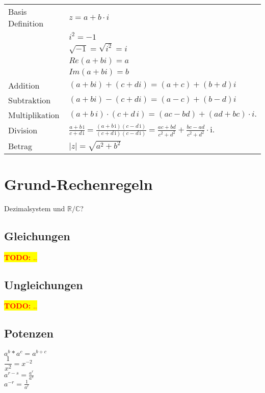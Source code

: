 \documentclass[10pt,a4paper]{article}
\newcommand{\todo}[1]{\begin{flushleft} \colorbox{yellow}{\textcolor{red}{\textbf{TODO:} {#1}}}\end{flushleft} }
\begin{document}
\renewcommand{\arraystretch}{1.5}
\begin{tabular}{ll}
Basis Definition & $ z = a + b \cdot i $ \\ 
				 & $ i^{2} = -1 $ \\ %
				 & $\sqrt{-1} = \sqrt{i^2} = i $ \\
				 & $Re(a + bi) = a$ \\
				 & $Im(a + bi) = b$ \\
Addition 		 & $ (a + bi) + (c + di) = (a+c)+(b+d)i $\\
Subtraktion 	 & $ (a + bi) - (c + di) = (a-c)+(b-d)i $\\
Multiplikation   &  $(a+b\,i)\cdot(c+d\,i)=(ac-bd) + (ad+bc)\cdot i. $\\
Division         & 
    $\frac{a+b\,\mathrm i}{c+d\,\mathrm i} = \frac{(a+b\,\mathrm i)(c-d\,\mathrm i)}{(c+d\,\mathrm i)(c-d\,\mathrm i)} = \frac{ac+bd}{c^2+d^2}+\frac{bc-ad}{c^2+d^2}\cdot\mathrm i. $\\
Betrag 			 & $ |z| = \sqrt{a^{2} + b^{2}} $ \\ 
\end{tabular} 






\section{Grund-Rechenregeln}

Dezimalsystem und $\mathbb{R}/\mathbb{C}$?



\subsection{Gleichungen}
\todo{.. }

\subsection{Ungleichungen}
\todo{.. }

\subsection{Potenzen}

$ a^{b} * a^{c} = a^{b+c} $\\
$ \dfrac{1}{x^2} = x^{-2}$\\
$a^{r-s}=\frac{a^r}{a^s}$\\
$ a^{-r} = \frac{1}{a^r}$\\
\end{document}
